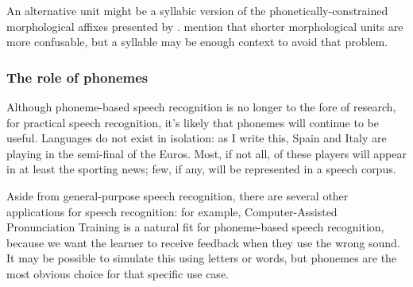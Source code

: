 \documentclass{article}[11pt]
\begin{document}
An alternative unit might be a syllabic version of the phonetically-constrained morphological affixes presented by \citet{huckvale_using_2002}. \citet{tachbelie_morpheme-based_2010} mention that shorter morphological units are more confusable, but a syllable may be enough context to avoid that problem.

\subsubsection{The role of phonemes}

Although phoneme-based speech recognition is no longer to the fore of research, for practical speech recognition, it's likely that phonemes will continue to be useful. Languages do not exist in isolation: as I write this, Spain and Italy are playing in the semi-final of the Euros. Most, if not all, of these players will appear in at least the sporting news; few, if any, will be represented in a speech corpus.

Aside from general-purpose speech recognition, there are several other applications for speech recognition: for example, Computer-Assisted Pronunciation Training is a natural fit for phoneme-based speech recognition, because we want the learner to receive feedback when they use the wrong sound. It may be possible to simulate this using letters or words, but phonemes are the most obvious choice for that specific use case.


\citet{li_acoustic--word_2017}



%
\end{document}
